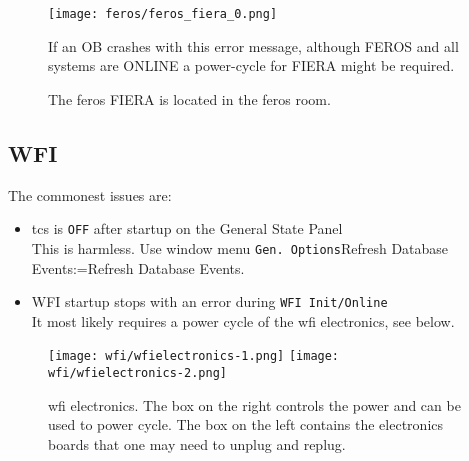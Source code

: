 \documentclass[11pt,fleqn,a4paper]{book}
\makeatletter
\def\menu#1#2{\texttt{#1}\ifx{}#2\else\@for\@x:=#2\do{$\rightarrow$\texttt{\@x}}\fi}
\def\wmenu#1#2{window menu \menu{#1}{#2}}
\makeatother
\begin{document}
\begin{figure}
	\centering
	\texttt{[image: feros/feros\_fiera\_0.png]}
	\caption[If an OB crashes although \gls{feros} is ONLINE]{If an OB crashes with this error message, although FEROS and all systems are ONLINE a power-cycle for FIERA might be required.}
	\label{fig:feros_fiera_0}	
\end{figure}

\begin{figure}[t!]
\begin{minipage}{0.48\linewidth}
\end{minipage}
\hspace{0.02\linewidth}
\begin{minipage}{0.48\linewidth}
\end{minipage}
\caption[\Gls{feros} FIERA] {The \gls{feros} FIERA is located in the \gls{feros} room.}
\label{fig:feros_fiera}
\end{figure}







\subsection{WFI}

The commonest issues are:
\begin{itemize}
  \item \gls{tcs} is \texttt{OFF} after startup on the \gls{General State} Panel\\
   This is harmless. Use \wmenu{Gen. Options}{Refresh Database Events}.
  \item WFI startup stops with an error during \texttt{WFI Init/Online}\\
       It most likely requires a \gls{power cycle} of the \gls{wfi} electronics, see below.
\end{itemize}

\begin{figure}[ht]
    \centering
	\texttt{[image: wfi/wfielectronics-1.png]}
	\linewidth
	\texttt{[image: wfi/wfielectronics-2.png]}
	\caption[WFI electronics: power cycle button and boards]{\gls{wfi} electronics.  The box on the right controls the power and can be used to \gls{power cycle}. The box on the left contains the electronics boards that one may need to unplug and replug.}
	\label{fig:wfielectronics}
\end{figure}
\end{document}
